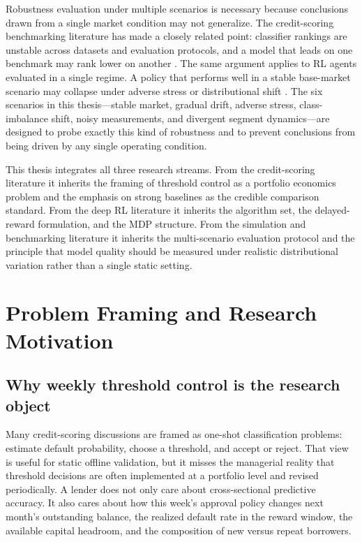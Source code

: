 \documentclass[12pt,a4paper]{article}
\begin{document}
Robustness evaluation under multiple scenarios is necessary because conclusions drawn from a single market condition may not generalize. The credit-scoring benchmarking literature has made a closely related point: classifier rankings are unstable across datasets and evaluation protocols, and a model that leads on one benchmark may rank lower on another \cite{lessmann2015, baesens2003}. The same argument applies to RL agents evaluated in a single regime. A policy that performs well in a stable base-market scenario may collapse under adverse stress or distributional shift \cite{bellotti2009}. The six scenarios in this thesis---stable market, gradual drift, adverse stress, class-imbalance shift, noisy measurements, and divergent segment dynamics---are designed to probe exactly this kind of robustness and to prevent conclusions from being driven by any single operating condition.

This thesis integrates all three research streams. From the credit-scoring literature it inherits the framing of threshold control as a portfolio economics problem and the emphasis on strong baselines as the credible comparison standard. From the deep RL literature it inherits the algorithm set, the delayed-reward formulation, and the MDP structure. From the simulation and benchmarking literature it inherits the multi-scenario evaluation protocol and the principle that model quality should be measured under realistic distributional variation rather than a single static setting.

\section{Problem Framing and Research Motivation}

\subsection{Why weekly threshold control is the research object}

Many credit-scoring discussions are framed as one-shot classification problems: estimate default probability, choose a threshold, and accept or reject. That view is useful for static offline validation, but it misses the managerial reality that threshold decisions are often implemented at a portfolio level and revised periodically. A lender does not only care about cross-sectional predictive accuracy. It also cares about how this week's approval policy changes next month's outstanding balance, the realized default rate in the reward window, the available capital headroom, and the composition of new versus repeat borrowers.
\end{document}
